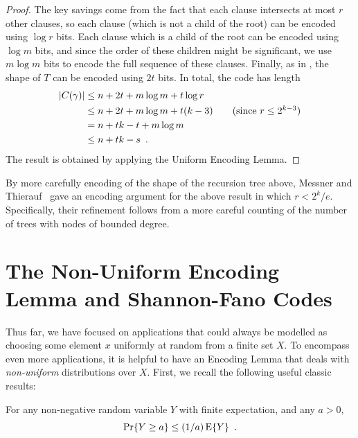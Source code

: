 \documentclass{patmorin}
\newcommand{\aremark}[3]{\textcolor{blue}{\textsc{#1 #2:}}
  \textcolor{red}{\textsf{#3}}}
\newcommand{\tommy}[2][says]{\aremark{Tommy}{#1}{#2}}
\newcommand{\wolfgang}[2][says]{\aremark{Wolfgang}{#1}{#2}}
\begin{document}
\begin{proof}
  The key savings come from the fact that each clause intersects at
  most $r$ other clauses, so each clause (which is not a child of the
  root) can be encoded using $\log r$ bits. Each clause which is a
  child of the root can be encoded using $\log m$ bits, and since the
  order of these children might be significant, we use $m \log m$ bits
  to encode the full sequence of these clauses. Finally, as in
  , the shape of $T$ can be encoded
  using $2t$ bits. In total, the code has length
  \begin{align*}
    |C(\gamma)| &\le n + 2t + m\log m+ t \log r \\
    &\le n + 2t + m\log m + t(k - 3) \tag{since $r \le 2^{k - 3}$} \\
    &= n + tk - t + m\log m \\
    &\le n + tk - s \enspace .
  \end{align*}
  The result is obtained by applying the Uniform Encoding Lemma.
\end{proof}

\begin{rem}
  By more carefully encoding of the shape of the recursion tree above,
  Messner and Thierauf~\cite{messner:ksat} gave an encoding argument
  for the above result in which $r < 2^k/e$. Specifically, their 
  refinement follows
  from a more careful counting of the number of trees with nodes of
  bounded degree.
\end{rem}

\section{The Non-Uniform Encoding Lemma and Shannon-Fano Codes}

Thus far, we have focused on applications that could always be
modelled as choosing some element $x$ uniformly at random from a
finite set $X$. To encompass even more applications, it is helpful to
have an Encoding Lemma that deals with \emph{non-uniform}
distributions over $X$. First, we recall the following useful classic
results: 
\begin{thm}
  For any non-negative random variable $Y$ with finite
  expectation, and any $a > 0$,
  \[
    \Pr\{Y \geq a\} \leq (1/a) \operatorname{\mathrm{E}}\{Y\} \enspace .
  \]
\end{thm}
\end{document}

